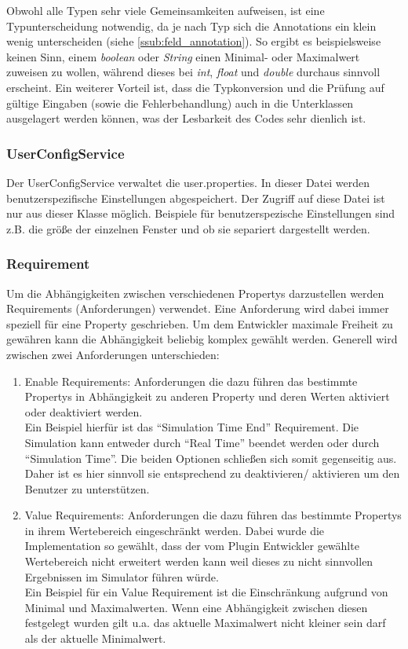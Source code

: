 \documentclass[a4paper, 11pt]{article} %
\begin{document}
 Obwohl alle Typen sehr viele Gemeinsamkeiten aufweisen, ist eine Typunterscheidung notwendig, da je nach Typ sich die Annotations ein klein wenig unterscheiden (siehe \ref{ssub:feld_annotation}). So ergibt es beispielsweise keinen Sinn, einem \emph{boolean} oder \emph{String} einen Minimal- oder Maximalwert zuweisen zu wollen, während dieses bei \emph{int}, \emph{float} und \emph{double} durchaus sinnvoll erscheint. Ein weiterer Vorteil ist, dass die Typkonversion und die Prüfung auf gültige Eingaben (sowie die Fehlerbehandlung) auch in die Unterklassen ausgelagert werden können, was der Lesbarkeit des Codes sehr dienlich ist. 

\subsubsection{UserConfigService} %
\label{ssub:userconfigservice}
Der UserConfigService verwaltet die user.properties. In dieser Datei werden benutzerspezifische Einstellungen abgespeichert. Der Zugriff auf diese Datei ist nur aus dieser Klasse möglich. Beispiele für benutzerspezische Einstellungen sind z.B. die größe der einzelnen Fenster und ob sie separiert dargestellt werden.

\subsubsection{Requirement} %
\label{ssub:requirement}
Um die Abhängigkeiten zwischen verschiedenen Propertys darzustellen werden Requirements (Anforderungen) verwendet. Eine Anforderung wird dabei immer speziell für eine Property geschrieben. Um dem Entwickler maximale Freiheit zu gewähren kann die Abhängigkeit beliebig komplex gewählt werden.
Generell wird zwischen zwei Anforderungen unterschieden:
\begin{enumerate}
	\item Enable Requirements: Anforderungen die dazu führen das bestimmte Propertys in Abhängigkeit zu anderen Property und deren Werten aktiviert oder deaktiviert werden.
	\\Ein Beispiel hierfür ist das "`Simulation Time End"' Requirement. Die Simulation kann entweder durch "`Real Time"' beendet werden oder durch "`Simulation Time"'. Die beiden Optionen schließen sich somit gegenseitig aus. Daher ist es hier sinnvoll sie entsprechend zu deaktivieren/ aktivieren um den Benutzer zu unterstützen.
	\item Value Requirements: Anforderungen die dazu führen das bestimmte Propertys in ihrem Wertebereich eingeschränkt werden. Dabei wurde die Implementation so gewählt, dass der vom Plugin Entwickler gewählte Wertebereich nicht erweitert werden kann weil dieses zu nicht sinnvollen Ergebnissen im Simulator führen würde.
	\\ Ein Beispiel für ein Value Requirement ist die Einschränkung aufgrund von Minimal und Maximalwerten. Wenn eine Abhängigkeit zwischen diesen festgelegt wurden gilt u.a. das aktuelle Maximalwert nicht kleiner sein darf als der aktuelle Minimalwert.
\end{enumerate}
\end{document}

